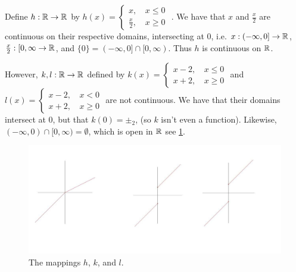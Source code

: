 \begin{example}
        Define $h:\mathbb{R} \rightarrow \mathbb{R}$ by $h(x)=
            \begin{cases}
                x \text{, } & x \leq 0 \\
                \frac{x}{2} \text{, } & x \geq 0 
            \end{cases}$
        . We have that $x$ and  $\frac{x}{2}$ are continuous on their respective domains,
        intersecting at $0$, i.e.  $x:(-\infty,0] \rightarrow \mathbb{R}$, $ \frac{x}{2}:[0,\infty
        \rightarrow \mathbb{R}$, and $\{0\}=(-\infty, 0] \cap [0, \infty)$. Thus $h$ is continuous on $\mathbb{R}$.


        However, $k,l:\mathbb{R} \rightarrow \mathbb{R}$ defined by $k(x)=
            \begin{cases}
                x-2 \text{, } & x \leq 0 \\
                x+2 \text{, } & x \geq 0 
            \end{cases}$
            and $l(x)=
            \begin{cases}
                x-2 \text{, } & x < 0 \\
                x+2 \text{, } & x \geq 0 
            \end{cases}$
            are not continuous. We have that their domains intersect at $0$, but that  $k(0)=\pm_2$,
            (so $k$ isn't even a function). Likewise, $(-\infty,0) \cap [0,\infty)=\emptyset$, which
            is open in $\mathbb{R}$ see \ref{fig_1.9}.

            \begin{figure}[h]
                \centering
                \includegraphics[scale = 0.2]{Figures/Chapter1/continuousFunctions.png}
                \caption{The mappings $h$, $k$, and  $l$.}
                \label{fig_1.9}
            \end{figure}
\end{example} 

